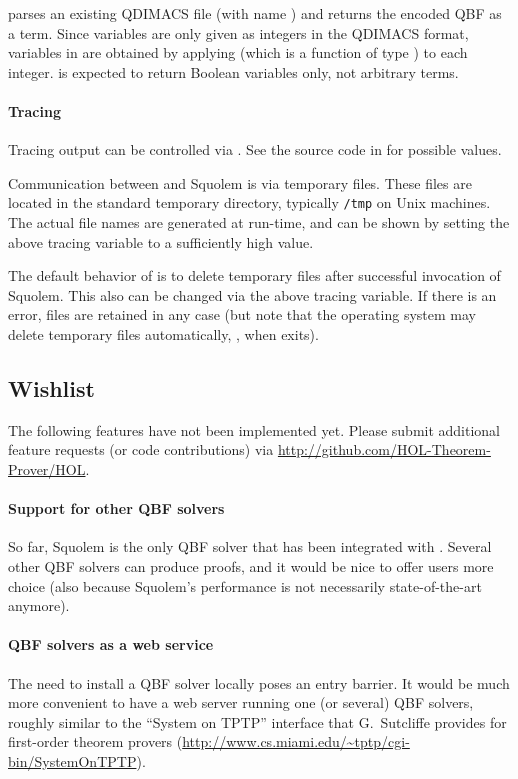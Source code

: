  parses an existing QDIMACS
file (with name ) and returns the encoded QBF as a \HOL{}
term.  Since variables are only given as integers in the QDIMACS
format, variables in \HOL{} are obtained by applying  (which is
a function of type ) to each integer.   is
expected to return Boolean variables only, not arbitrary \HOL{} terms.

\paragraph{Tracing}

Tracing output can be controlled via .  See the source code in  for possible
values.

Communication between \HOL{} and Squolem is via temporary files.
These files are located in the standard temporary directory, typically
{\tt /tmp} on Unix machines.  The actual file names are generated at
run-time, and can be shown by setting the above tracing variable to a
sufficiently high value.

The default behavior of  is to delete temporary files
after successful invocation of Squolem.  This also can be changed via
the above tracing variable.  If there is an error, files are retained
in any case (but note that the operating system may delete temporary
files automatically, \eg, when \HOL{} exits).

\subsection{Wishlist}

The following features have not been implemented yet.
Please submit additional feature requests (or code contributions) via \url{http://github.com/HOL-Theorem-Prover/HOL}.

\paragraph{Support for other QBF solvers}

So far, Squolem is the only QBF solver that has been integrated with
\HOL.  Several other QBF solvers can produce proofs, and it would be
nice to offer \HOL{} users more choice (also because Squolem's
performance is not necessarily state-of-the-art anymore).

\paragraph{QBF solvers as a web service}

The need to install a QBF solver locally poses an entry barrier.  It
would be much more convenient to have a web server running one (or
several) QBF solvers, roughly similar to the ``System on TPTP''
interface that G.~Sutcliffe provides for first-order theorem provers
(\url{http://www.cs.miami.edu/~tptp/cgi-bin/SystemOnTPTP}).


